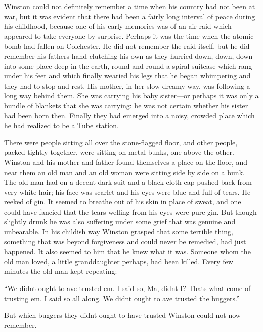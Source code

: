 Winston could not definitely remember a time when his country had not
been at war, but it was evident that there had been a fairly long
interval of peace during his childhood, because one of his early
memories was of an air raid which appeared to take everyone by surprise.
Perhaps it was the time when the atomic bomb had fallen on Colchester.
He did not remember the raid itself, but he did remember his
father\textquotesingle s hand clutching his own as they hurried down,
down, down into some place deep in the earth, round and round a spiral
suitcase which rang under his feet and which finally wearied his legs
that he began whimpering and they had to stop and rest. His mother, in
her slow dreamy way, was following a long way behind them. She was
carrying his baby sister---or perhaps it was only a bundle of blankets
that she was carrying: he was not certain whether his sister had been
born then. Finally they had emerged into a noisy, crowded place which he
had realized to be a Tube station.

There were people sitting all over the stone-flagged floor, and other
people, packed tightly together, were sitting on metal bunks, one above
the other. Winston and his mother and father found themselves a place on
the floor, and near them an old man and an old woman were sitting side
by side on a bunk. The old man had on a decent dark suit and a black
cloth cap pushed back from very white hair; his face was scarlet and his
eyes were blue and full of tears. He reeked of gin. It seemed to breathe
out of his skin in place of sweat, and one could have fancied that the
tears welling from his eyes were pure gin. But though slightly drunk he
was also suffering under some grief that was genuine and unbearable. In
his childish way Winston grasped that some terrible thing, something
that was beyond forgiveness and could never be remedied, had just
happened. It also seemed to him that he knew what it was. Someone whom
the old man loved, a little granddaughter perhaps, had been killed.
Every few minutes the old man kept repeating:

``We didn\textquotesingle t ought to \textquotesingle ave trusted
\textquotesingle em. I said so, Ma, didn\textquotesingle t I?
That\textquotesingle s what come of trusting \textquotesingle em. I said
so all along. We didn\textquotesingle t ought to \textquotesingle ave
trusted the buggers.''

But which buggers they didn\textquotesingle t ought to have trusted
Winston could not now remember.

